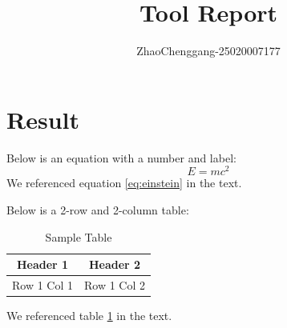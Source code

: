 \documentclass{article}
\begin{document}
\title{Tool Report}
\author{ZhaoChenggang-25020007177}
\maketitle

\section{Result}

Below is an equation with a number and label:
\begin{equation}
    E = mc^2 \label{eq:einstein}
\end{equation}
We referenced equation \eqref{eq:einstein} in the text.

Below is a 2-row and 2-column table:
\begin{table}[h]
    \centering
    \begin{tabular}{|c|c|}
        \hline
        Header 1 & Header 2 \\ \hline
        Row 1 Col 1 & Row 1 Col 2 \\ \hline
    \end{tabular}
    \caption{Sample Table}
    \label{tab:sample}
\end{table}
We referenced table \ref{tab:sample} in the text.
\end{document}
